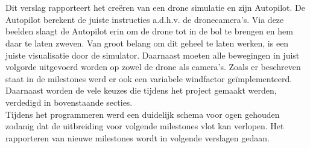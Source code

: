 \\
\\
Dit verslag rapporteert het cre\"eren van een drone simulatie en zijn Autopilot. De Autopilot berekent de juiste instructies a.d.h.v. de dronecamera's. Via deze beelden slaagt de Autopilot erin om de drone tot in de bol te brengen en hem daar te laten zweven. Van groot belang om dit geheel te laten werken, is een juiste visualisatie door de simulator. Daarnaast moeten alle bewegingen in juist volgorde uitgevoerd worden op zowel de drone als camera's. Zoals er beschreven staat in de milestones werd er ook een variabele windfactor ge\"implementeerd.
\\ 
Daarnaast worden de vele keuzes die tijdens het project gemaakt werden, verdedigd in bovenstaande secties.
\\
Tijdens het programmeren werd een duidelijk schema voor ogen gehouden zodanig dat de uitbreiding voor volgende milestones vlot kan verlopen. Het rapporteren van nieuwe milestones wordt in volgende verslagen gedaan.\\